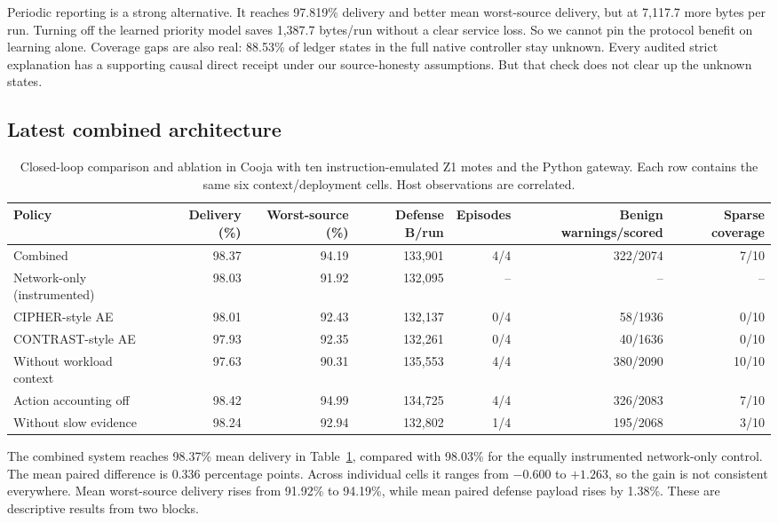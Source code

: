 \documentclass[journal]{IEEEtran}
\begin{document}
Periodic reporting is a strong alternative. It reaches 97.819\% delivery and better mean worst-source delivery, but at 7,117.7 more bytes per run. Turning off the learned priority model saves 1,387.7 bytes/run without a clear service loss. So we cannot pin the protocol benefit on learning alone. Coverage gaps are also real: 88.53\% of ledger states in the full native controller stay unknown. Every audited strict explanation has a supporting causal direct receipt under our source-honesty assumptions. But that check does not clear up the unknown states.

\subsection{Latest combined architecture}
\begin{table}[t]
\caption{Closed-loop comparison and ablation in Cooja with ten instruction-emulated Z1 motes and the Python gateway. Each row contains the same six context/deployment cells. Host observations are correlated.}
\label{tab:combined}\centering\small
\begin{tabular}{lrrrrrr}\toprule
Policy & Delivery (\%) & Worst-source (\%) & Defense B/run & Episodes & Benign warnings/scored & Sparse coverage\\\midrule
Combined &98.37&94.19&133,901&4/4&322/2074&7/10\\
Network-only (instrumented)&98.03&91.92&132,095&--&--&--\\
CIPHER-style AE&98.01&92.43&132,137&0/4&58/1936&0/10\\
CONTRAST-style AE&97.93&92.35&132,261&0/4&40/1636&0/10\\
Without workload context&97.63&90.31&135,553&4/4&380/2090&10/10\\
Action accounting off&98.42&94.99&134,725&4/4&326/2083&7/10\\
Without slow evidence&98.24&92.94&132,802&1/4&195/2068&3/10\\\bottomrule
\end{tabular}
\end{table}

The combined system reaches 98.37\% mean delivery in Table~\ref{tab:combined}, compared with 98.03\% for the equally instrumented network-only control. The mean paired difference is 0.336 percentage points. Across individual cells it ranges from $-0.600$ to $+1.263$, so the gain is not consistent everywhere. Mean worst-source delivery rises from 91.92\% to 94.19\%, while mean paired defense payload rises by 1.38\%. These are descriptive results from two blocks.
\end{document}
